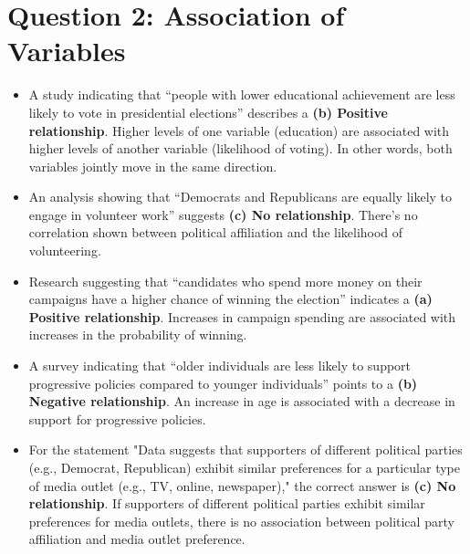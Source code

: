 \documentclass{article}
\begin{document}
\section*{Question 2: Association of Variables}
\begin{itemize}
    \item A study indicating that ``people with lower educational achievement are less likely to vote in presidential elections'' describes a \textbf{(b) Positive relationship}. Higher levels of one variable (education) are associated with higher levels of another variable (likelihood of voting). In other words, both variables jointly move in the same direction.
    \item An analysis showing that ``Democrats and Republicans are equally likely to engage in volunteer work'' suggests \textbf{(c) No relationship}. There's no correlation shown between political affiliation and the likelihood of volunteering.
    \item Research suggesting that ``candidates who spend more money on their campaigns have a higher chance of winning the election'' indicates a \textbf{(a) Positive relationship}. Increases in campaign spending are associated with increases in the probability of winning.
    \item A survey indicating that ``older individuals are less likely to support progressive policies compared to younger individuals'' points to a \textbf{(b) Negative relationship}. An increase in age is associated with a decrease in support for progressive policies.
    \item For the statement "Data suggests that supporters of different political parties (e.g., Democrat, Republican) exhibit similar preferences for a particular type of media outlet (e.g., TV, online, newspaper)," the correct answer is \textbf{(c) No relationship}. If supporters of different political parties exhibit similar preferences for media outlets, there is no association between political party affiliation and media outlet preference.
\end{itemize}
\end{document}
